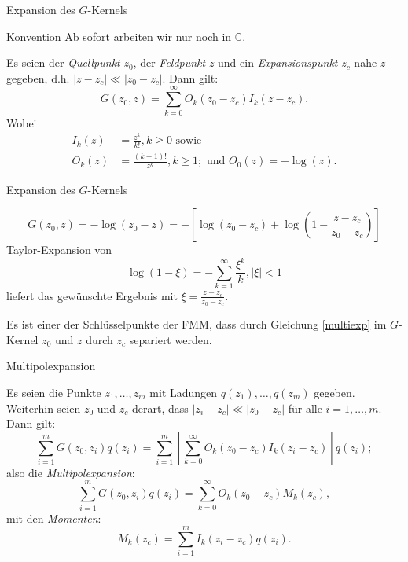 \documentclass[ngerman]{beamer}
\begin{document}
\begin{frame}{Expansion des $G$-Kernels}
\normalsize
\begin{alertblock}{Konvention}
Ab sofort arbeiten wir nur noch in $\mathbb{C}$.
\end{alertblock}
\begin{Lemma}
Es seien der \emph{Quellpunkt} $z_0$, der \emph{Feldpunkt} $z$ und ein \emph{Expansionspunkt} $z_c$ nahe $z$ gegeben, d.h. $|z-z_c| \ll |z_0-z_c|$. Dann gilt: 
\begin{equation}\label{multiexp}
G(z_0,z) = \sum_{k=0}^\infty {O_k(z_0-z_c)I_k(z-z_c)}.
\end{equation}
Wobei 
\begin{align*}
 \nonumber
I_k(z)&=\frac{z^k}{k!}, k\geq 0 \text{ sowie } \\ 
O_k(z)&=\frac{(k-1)!}{z^k}, k\geq 1; \text{ und } O_0(z)=-\log(z).
\end{align*}
\end{Lemma}
\end{frame}

\begin{frame}{Expansion des $G$-Kernels}
\begin{Beweis}
\[
G(z_0,z) = -\log(z_0-z) = -\left[\log(z_0-z_c) + \log \left(1-\frac{z-z_c}{z_0-z_c}\right)\right]
\]
Taylor-Expansion von \[\log(1-\xi) = -\sum_{k=1}^\infty {\frac{\xi^k}{k} }, |\xi| < 1\] liefert das gewünschte Ergebnis mit $\xi = \frac{z-z_c}{z_0-z_c}$.
\end{Beweis}
\begin{alertblock}{}
Es ist einer der Schlüsselpunkte der FMM, dass durch Gleichung \eqref{multiexp} im $G$-Kernel $z_0$ und $z$ durch $z_c$ separiert werden.
\end{alertblock}
\end{frame}

\begin{frame}{Multipolexpansion}
\small
\begin{Satz}[Multipolexpansion]
Es seien die Punkte $z_1,\ldots, z_m$ mit Ladungen $q(z_1),\ldots,q(z_m)$ gegeben. Weiterhin seien $z_0$ und $z_c$ derart, dass $|z_i-z_c| \ll |z_0-z_c|$ für alle $i=1,\ldots,m$. Dann gilt:
\begin{equation}\nonumber
\sum_{i=1}^m {G(z_0,z_i)q(z_i)} = \sum_{i=1}^m \left[\sum_{k=0}^\infty O_k(z_0-z_c)I_k(z_i-z_c)\right] q(z_i);
\end{equation}
also die \emph{Multipolexpansion}:
\begin{equation}\label{multipolexp}
\sum_{i=1}^m {G(z_0,z_i)q(z_i)} = \sum_{k=0}^\infty O_k(z_0-z_c)M_k(z_c),
\end{equation}
mit den \emph{Momenten}:
\begin{equation}\label{moments}
M_k(z_c) =  \sum_{i=1}^m I_k(z_i-z_c) q(z_i).
\end{equation}
\end{Satz}
\end{frame}
\end{document}
